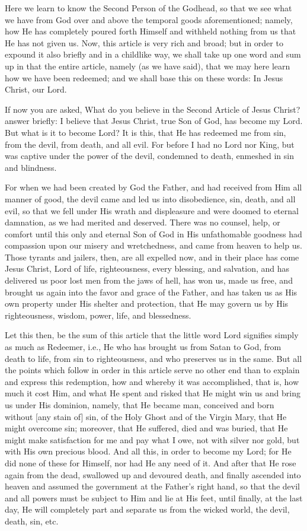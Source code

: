 Here we learn to know the Second Person of the Godhead, so that we see
what we have from God over and above the temporal goods
aforementioned; namely, how He has completely poured forth Himself and
withheld nothing from us that He has not given us. Now, this article is
very rich and broad; but in order to expound it also briefly and in a
childlike way, we shall take up one word and sum up in that the entire
article, namely (as we have said), that we may here learn how we have
been redeemed; and we shall base this on these words: In Jesus Christ,
our Lord.

If now you are asked, What do you believe in the Second Article of
Jesus Christ? answer briefly: I believe that Jesus Christ, true Son of
God, has become my Lord. But what is it to become Lord? It is this,
that He has redeemed me from sin, from the devil, from death, and all
evil. For before I had no Lord nor King, but was captive under the
power of the devil, condemned to death, enmeshed in sin and blindness.

For when we had been created by God the Father, and had received from
Him all manner of good, the devil came and led us into disobedience,
sin, death, and all evil, so that we fell under His wrath and
displeasure and were doomed to eternal damnation, as we had merited and
deserved. There was no counsel, help, or comfort until this only and
eternal Son of God in His unfathomable goodness had compassion upon our
misery and wretchedness, and came from heaven to help us. Those tyrants
and jailers, then, are all expelled now, and in their place has come
Jesus Christ, Lord of life, righteousness, every blessing, and
salvation, and has delivered us poor lost men from the jaws of hell,
has won us, made us free, and brought us again into the favor and grace
of the Father, and has taken us as His own property under His shelter
and protection, that He may govern us by His righteousness, wisdom,
power, life, and blessedness.

Let this then, be the sum of this article that the little word Lord
signifies simply as much as Redeemer, i.e., He who has brought us from
Satan to God, from death to life, from sin to righteousness, and who
preserves us in the same. But all the points which follow in order in
this article serve no other end than to explain and express this
redemption, how and whereby it was accomplished, that is, how much it
cost Him, and what He spent and risked that He might win us and bring
us under His dominion, namely, that He became man, conceived and born
without [any stain of] sin, of the Holy Ghost and of the Virgin Mary,
that He might overcome sin; moreover, that He suffered, died and was
buried, that He might make satisfaction for me and pay what I owe, not
with silver nor gold, but with His own precious blood. And all this, in
order to become my Lord; for He did none of these for Himself, nor had
He any need of it. And after that He rose again from the dead,
swallowed up and devoured death, and finally ascended into heaven and
assumed the government at the Father's right hand, so that the devil
and all powers must be subject to Him and lie at His feet, until
finally, at the last day, He will completely part and separate us from
the wicked world, the devil, death, sin, etc.

